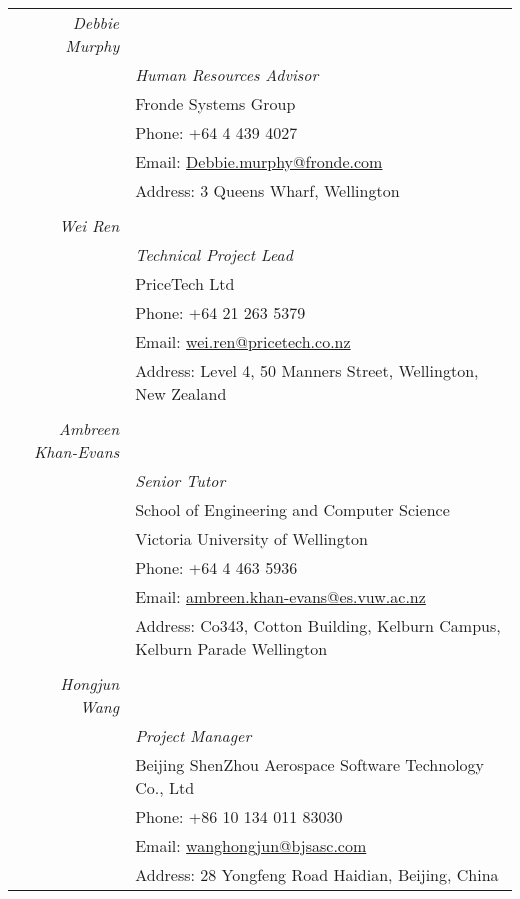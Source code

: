 \documentclass[a4paper,10pt]{article} %
\begin{document}
\begin{tabular}{r|p{11cm}}
\emph{Debbie Murphy}&  \\
& \emph{Human Resources Advisor}\\ 
& Fronde Systems Group\\
& Phone:  +64 4 439 4027\\
& Email: \href{mailto:Debbie.murphy@fronde.com}{Debbie.murphy@fronde.com}\\
& Address: 3 Queens Wharf, Wellington\\
\multicolumn{2}{c}{} \\


\emph{Wei Ren}&  \\
& \emph{Technical Project Lead}\\ 
& PriceTech Ltd\\
& Phone: +64 21 263 5379\\
& Email: \href{mailto:wei.ren@pricetech.co.nz}{wei.ren@pricetech.co.nz}\\
& Address: Level 4, 50 Manners Street, Wellington, New Zealand \\
\multicolumn{2}{c}{} \\

\emph{Ambreen Khan-Evans}&  \\
& \emph{Senior Tutor}\\ 
& School of Engineering and Computer Science\\
& Victoria University of Wellington\\
& Phone: +64 4 463 5936\\
& Email: \href{mailto:ambreen.khan-evans@es.vuw.ac.nz}{ambreen.khan-evans@es.vuw.ac.nz}\\
& Address:  Co343, Cotton Building, Kelburn Campus, Kelburn Parade Wellington \\
\multicolumn{2}{c}{} \\

\emph{Hongjun Wang}&  \\
& \emph{Project Manager}\\ 
& Beijing ShenZhou Aerospace Software Technology Co., Ltd\\
& Phone: +86 10 134 011 83030\\
& Email: \href{mailto:wanghongjun@bjsasc.com}{wanghongjun@bjsasc.com}\\
& Address: 28 Yongfeng Road Haidian, Beijing, China \\

\end{tabular}
\end{document}
